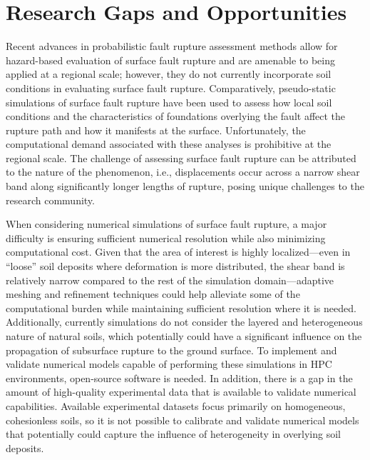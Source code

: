 \section{Research Gaps and Opportunities}
\label{sec:eq_surface_rup_research_gaps}
Recent advances in probabilistic fault rupture assessment methods allow for hazard-based evaluation of surface fault rupture and are amenable to being applied at a regional scale; however, they do not currently incorporate soil conditions in evaluating surface fault rupture. Comparatively, pseudo-static simulations of surface fault rupture have been used to assess how local soil conditions and the characteristics of foundations overlying the fault affect the rupture path and how it manifests at the surface. Unfortunately, the computational demand associated with these analyses is prohibitive at the regional scale. The challenge of assessing surface fault rupture can be attributed to the nature of the phenomenon, i.e., displacements occur across a narrow shear band along significantly longer lengths of rupture, posing unique challenges to the research community.


When considering numerical simulations of surface fault rupture, a major difficulty is ensuring sufficient numerical resolution while also minimizing computational cost. Given that the area of interest is highly localized---even in ``loose'' soil deposits where deformation is more distributed, the shear band is relatively narrow compared to the rest of the simulation domain---adaptive meshing and refinement techniques could help alleviate some of the computational burden while maintaining sufficient resolution where it is needed. Additionally, currently simulations do not consider the layered and heterogeneous nature of natural soils, which potentially could have a significant influence on the propagation of subsurface rupture to the ground surface. To implement and validate numerical models capable of performing these simulations in HPC environments, open-source software is needed. In addition, there is a gap in the amount of high-quality experimental data that is available to validate numerical capabilities. Available experimental datasets focus primarily on homogeneous, cohesionless soils, so it is not possible to calibrate and validate numerical models that potentially could capture the influence of heterogeneity in overlying soil deposits.

